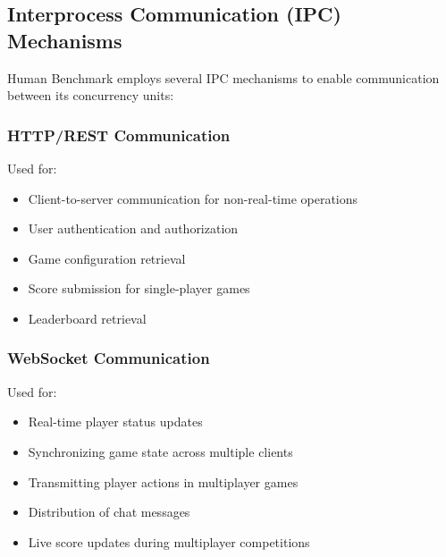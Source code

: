 

\subsection{Interprocess Communication (IPC) Mechanisms}

Human Benchmark employs several IPC mechanisms to enable communication between its concurrency units:

\subsubsection{HTTP/REST Communication}

Used for:
\begin{itemize}
    \item Client-to-server communication for non-real-time operations
    \item User authentication and authorization
    \item Game configuration retrieval
    \item Score submission for single-player games
    \item Leaderboard retrieval
\end{itemize}

\subsubsection{WebSocket Communication}

Used for:
\begin{itemize}
    \item Real-time player status updates
    \item Synchronizing game state across multiple clients
    \item Transmitting player actions in multiplayer games
    \item Distribution of chat messages
    \item Live score updates during multiplayer competitions
\end{itemize}

